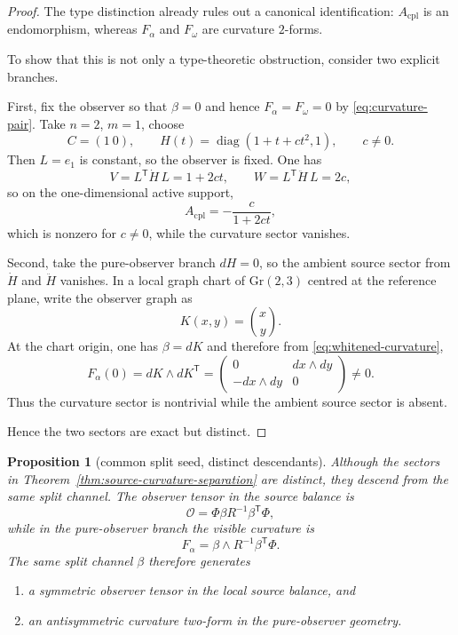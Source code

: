 \documentclass[11pt,a4paper]{article}
\numberwithin{equation}{section}
\DeclareMathOperator{\diag}{diag}
\theoremstyle{thmcompact}
\newtheorem{proposition}[theorem]{Proposition}
\theoremstyle{remark}
\begin{document}
\begin{proof}
The type distinction already rules out a canonical identification: $A_{\mathrm{cpl}}$ is an endomorphism, whereas $F_{\alpha}$ and $F_{\omega}$ are curvature $2$-forms.

To show that this is not only a type-theoretic obstruction, consider two explicit branches.

First, fix the observer so that $\beta=0$ and hence $F_{\alpha}=F_{\omega}=0$ by \eqref{eq:curvature-pair}. Take $n=2$, $m=1$, choose
\[
C=(1\ 0),
\qquad
H(t)=\diag(1+t+ct^2,1),
\qquad c\ne0.
\]
Then $L=e_1$ is constant, so the observer is fixed. One has
\[
V=L^{\mathsf T}\dot H\,L=1+2ct,
\qquad
W=L^{\mathsf T}\ddot H\,L=2c,
\]
so on the one-dimensional active support,
\[
A_{\mathrm{cpl}}=-\frac{c}{1+2ct},
\]
which is nonzero for $c\ne0$, while the curvature sector vanishes.

Second, take the pure-observer branch $dH=0$, so the ambient source sector from $\dot H$ and $\ddot H$ vanishes. In a local graph chart of $\mathrm{Gr}(2,3)$ centred at the reference plane, write the observer graph as
\[
K(x,y)=\binom{x}{y}.
\]
At the chart origin, one has $\beta=dK$ and therefore from \eqref{eq:whitened-curvature},
\[
F_{\alpha}(0)=dK\wedge dK^{\mathsf T}
=
\begin{pmatrix}
0 & dx\wedge dy\\
-dx\wedge dy & 0
\end{pmatrix}
\neq 0.
\]
Thus the curvature sector is nontrivial while the ambient source sector is absent.

Hence the two sectors are exact but distinct.
\end{proof}

\begin{proposition}[common split seed, distinct descendants]\label{prop:common-seed}
Although the sectors in Theorem~\ref{thm:source-curvature-separation} are distinct, they descend from the same split channel. The observer tensor in the source balance is
\begin{equation}
\mathcal O=\Phi\beta R^{-1}\beta^{\mathsf T}\Phi,
\label{eq:observer-tensor}
\end{equation}
while in the pure-observer branch the visible curvature is
\begin{equation}
F_{\alpha}=\beta\wedge R^{-1}\beta^{\mathsf T}\Phi.
\label{eq:observer-curvature-again}
\end{equation}
The same split channel $\beta$ therefore generates
\begin{enumerate}
    \item a symmetric observer tensor in the local source balance, and
    \item an antisymmetric curvature two-form in the pure-observer geometry.
\end{enumerate}
\end{proposition}
\end{document}
